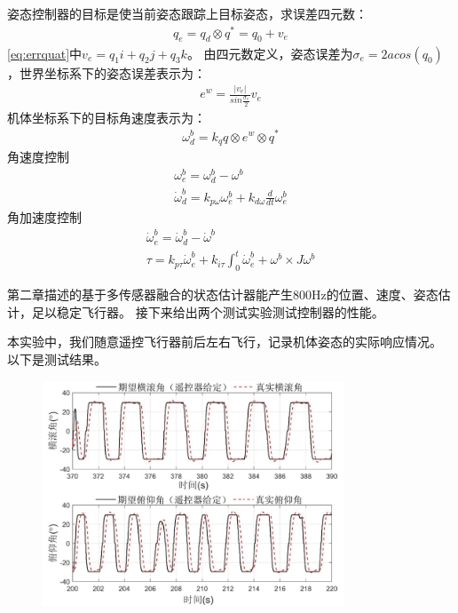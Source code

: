 \documentclass[
  type=master
]{gdutthesis}
\begin{document}
姿态控制器的目标是使当前姿态跟踪上目标姿态，求误差四元数：\vspace{1ex}
\begin{gather}\label{eq:errquat}
	q_e = q_d \otimes q^{*} = q_0 + v_e
\end{gather}
\autoref{eq:errquat}中$v_e = q_1 i + q_2 j + q_3 k$。
由四元数定义，姿态误差为$\sigma_e = 2acos(q_0)$，世界坐标系下的姿态误差表示为：
\begin{gather}
	e^w = \frac{\left| v_e \right|}{sin\frac{\sigma_e}{2}} v_e
\end{gather}
机体坐标系下的目标角速度表示为：
\begin{gather}
	\omega^b_d = k_q q \otimes e^w \otimes q^{*}
\end{gather}
角速度控制
\begin{gather}\label{eq:angularacontrol}
	\omega^b_e = \omega^b_d - \omega^b\\
	\dot{\omega}^b_d = k_{p \omega} \omega^b_e + k_{d \omega} \frac{d}{dt}\omega^b_e
\end{gather}
角加速度控制
\begin{gather}\label{eq:angularaccelerationcontrol}
		\dot{\omega}^b_e = \dot{\omega}^b_d - \dot{\omega}^b\\
		\tau = k_{p \tau} \dot{\omega}^b_e + k_{i \tau} \int_{0}^{t}\dot{\omega}^b_e + \omega^b \times J \omega^b
\end{gather}

第二章描述的基于多传感器融合的状态估计器能产生800Hz的位置、速度、姿态估计，足以稳定飞行器。
接下来给出两个测试实验测试控制器的性能。

本实验中，我们随意遥控飞行器前后左右飞行，记录机体姿态的实际响应情况。
以下是测试结果。

\begin{figure}[htbp]
	\centering
	\includegraphics[width=0.8\textwidth]{屏幕截图 2022-04-06 150427.png}
	\label{fig:Rptrackingresults}
\end{figure}
\end{document}
